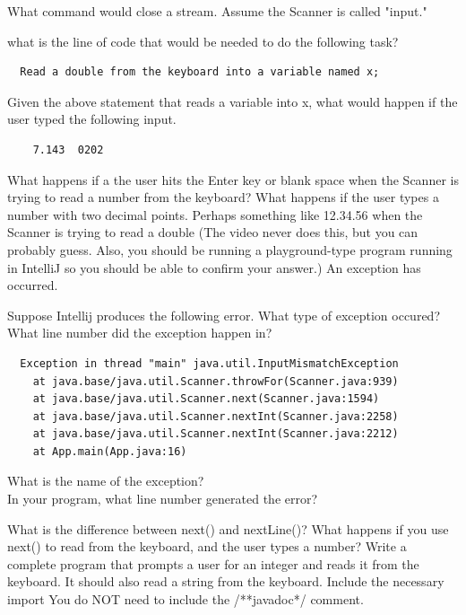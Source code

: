 \documentclass[letterpaper,11pt]{exam}
\begin{document}
\begin{questions}
\question What command would close a stream.  Assume the Scanner is called "input."
\begin{samepage}
\question what is the line of code that would be needed to do the following task?
\begin{verbatim}
  Read a double from the keyboard into a variable named x;
\end{verbatim}
\end{samepage}
\begin{samepage}
\question Given the above statement that reads a variable into x, what would happen if the user typed the following input.  
\begin{verbatim}
    7.143  0202
\end{verbatim}
\end{samepage}
\question What happens if a the user hits the Enter key or blank space when the Scanner is trying to read a number from the keyboard?
\question What happens if the user types a number with two decimal points.  Perhaps something like 12.34.56 when the Scanner is trying to read a double (The video never does this, but you can probably guess.  Also, you should be running a playground-type program running in IntelliJ so you should be able to confirm your answer.)
\question An exception has occurred.  
\begin{samepage}
\question Suppose Intellij produces the following error.  What type of exception occured?  What line number did the exception happen in?
\begin{verbatim}
  Exception in thread "main" java.util.InputMismatchException
	at java.base/java.util.Scanner.throwFor(Scanner.java:939)
	at java.base/java.util.Scanner.next(Scanner.java:1594)
	at java.base/java.util.Scanner.nextInt(Scanner.java:2258)
	at java.base/java.util.Scanner.nextInt(Scanner.java:2212)
	at App.main(App.java:16)
\end{verbatim}
  What is the name of the exception?\\
  In your program, what line number generated the error?
\end{samepage}
\question What is the difference between next() and nextLine()?
\vspace{1cm}
\question What happens if you use next() to read from the keyboard, and the user types a number?
\question Write a complete program that prompts a user for an integer and reads it from the keyboard.  It should also read a string from the keyboard. Include the necessary import  You do NOT need to include the /**javadoc*/ comment.
\vspace{2in}


\end{questions}
\end{document}
